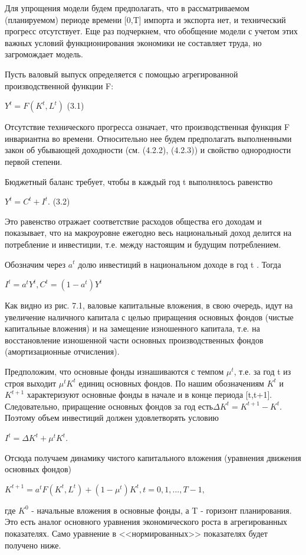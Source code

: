 \documentclass[12pt, 4paper]{book}
\begin{document}
{Для упрощения модели будем предполагать, что в рассматриваемом (планируемом) периоде времени [0,T] импорта и экспорта нет, и технический прогресс отсутствует. Еще раз подчеркнем, что обобщение модели с учетом этих важных условий функционирования экономики не составляет труда, но загромождает модель.
\par

Пусть валовый выпуск определяется с помощью агрегированной производственной функции F:
\begin{center}
$Y^t = F(K^t,L^t)$ (3.1)
\end{center}
\par

Отсутствие технического прогресса означает, что производственная функция F инвариантна во времени. Относительно нее будем предполагать выполненными закон об убывающей доходности (см. (4.2.2), (4.2.3)) и свойство однородности первой степени.
\par

Бюджетный баланс требует, чтобы в каждый год t выполнялось равенство
\begin{center}
$Y^t = C^t + I^t.$ (3.2)
\end{center}
\par

Это равенство отражает соответствие расходов общества его доходам и показывает, что на макроуровне ежегодно весь национальный доход делится на потребление и инвестиции, т.е. между настоящим и будущим потреблением.
\par

Обозначим через $a^t$ долю инвестиций в национальном доходе в год t . Тогда
\begin{center}
$I^t = a^t Y^t, C^t = (1-a^t)Y^t$
\end{center}
\par

Как видно из рис. 7.1, валовые капитальные вложения, в свою очередь, идут на увеличение наличного капитала с целью приращения основных фондов (чистые капитальные вложения) и на замещение изношенного капитала, т.е. на восстановление изношенной части основных производственных фондов (амортизационные отчисления).
\par

Предположим, что основные фонды изнашиваются с темпом $\mu^t$, т.е. за год t из строя выходит $\mu^t K^t$ единиц основных фондов. По нашим обозначениям $K^t$ и $K^{t+1}$ характеризуют основные фонды в начале и в конце периода [t,t+1]. Следовательно, приращение основных фондов за год есть$\Delta K^t=K^{t+1} - K^t$. Поэтому объем инвестиций должен удовлетворять условию
\begin{center}
$I^t = \Delta K^t + \mu^t K^t$.
\end{center}
Отсюда получаем динамику чистого капитального вложения (уравнения движения основных фондов)
\begin{center}
$K^{t+1}=a^t F(K^t,L^t)+(1-\mu^t)K^t, t=0,1,...,T-1,$
\end{center}
где $K^0$ - начальные вложения в основные фонды, а T - горизонт планирования. Это есть аналог основного уравнения экономического роста в агрегированных показателях. Само уравнение в <<нормированных>> показателях будет получено ниже.
\par

}
\end{document}
